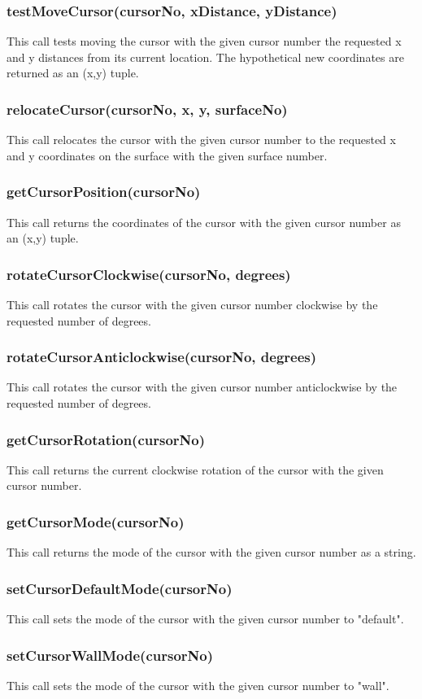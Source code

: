\documentclass{acm_proc_article-sp}
\begin{document}
\subsubsection{testMoveCursor(cursorNo, xDistance, yDistance)}
This call tests moving the cursor with the given cursor number the requested x and y distances from its current location. The hypothetical new coordinates are returned as an (x,y) tuple.
\subsubsection{relocateCursor(cursorNo, x, y, surfaceNo)}
This call relocates the cursor with the given cursor number to the requested x and y coordinates on the surface with the given surface number.
\subsubsection{getCursorPosition(cursorNo)}
This call returns the coordinates of the cursor with the given cursor number as an (x,y) tuple.
\subsubsection{rotateCursorClockwise(cursorNo, degrees)}
This call rotates the cursor with the given cursor number clockwise by the requested number of degrees.
\subsubsection{rotateCursorAnticlockwise(cursorNo, degrees)}
This call rotates the cursor with the given cursor number anticlockwise by the requested number of degrees.
\subsubsection{getCursorRotation(cursorNo)}
This call returns the current clockwise rotation of the cursor with the given cursor number.
\subsubsection{getCursorMode(cursorNo)}
This call returns the mode of the cursor with the given cursor number as a string.
\subsubsection{setCursorDefaultMode(cursorNo)}
This call sets the mode of the cursor with the given cursor number to "default".
\subsubsection{setCursorWallMode(cursorNo)}
This call sets the mode of the cursor with the given cursor number to "wall".
\end{document}
